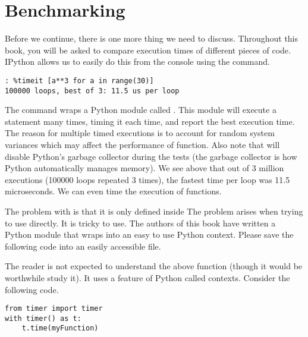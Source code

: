 
\section*{Benchmarking}
Before we continue, there is one more thing we need to discuss.  Throughout this book, you will be asked to compare execution times of different pieces of code.  IPython allows us to easily do this from the console using the  command.
\begin{lstlisting}
: %timeit [a**3 for a in range(30)]
100000 loops, best of 3: 11.5 us per loop
\end{lstlisting}
The  command wraps a Python module called .  This module will execute a statement many times, timing it each time, and report the best execution time.  The reason for multiple timed executions is to account for random system variances which may affect the performance of function.  Also note that  will disable Python's garbage collector during the tests (the garbage collector is how Python automatically manages memory).  We see above that out of 3 million executions (100000 loops repeated 3 times), the fastest time per loop was 11.5 microseconds.  We can even time the execution of functions.

The problem with  is that it is only defined inside The problem arises when trying to use  directly.  It is tricky to use.  The authors of this book have written a Python module that wraps  into an easy to use Python context.  Please save the following code into an easily accessible file.



The reader is not expected to understand the above function (though it would be worthwhile study it).  It uses a feature of Python called contexts.  Consider the following code.
\begin{lstlisting}
from timer import timer
with timer() as t:
    t.time(myFunction)
\end{lstlisting}

